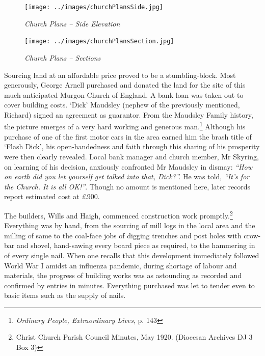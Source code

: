 \begin{figure}[!htb]
\begin{center}
\texttt{[image: ../images/churchPlansSide.jpg]}
\caption{\itshape Church Plans -- Side Elevation}
\end{center}
\end{figure}










\begin{figure}[!htb]
\begin{center}
\texttt{[image: ../images/churchPlansSection.jpg]}
\caption{\itshape Church Plans -- Sections}
\end{center}
\end{figure}




Sourcing land at an affordable price proved to be a stumbling-block. Most generously, George Arnell purchased and donated the land for the site of this much anticipated Murgon Church of England. A bank loan was taken out to cover building costs. `Dick' Maudsley (nephew of the previously mentioned, Richard) signed an agreement as guarantor. From the Maudsley Family history, the picture emerges of a very hard working and generous man.\footnote{\emph{Ordinary People, Extraordinary Lives}, p. 143} Although his purchase of one of the first motor cars in the area earned him the brash title of `Flash Dick', his open-handedness and faith through this sharing of his prosperity were then clearly revealed. Local bank manager and church member, Mr Skyring, on learning of his decision, anxiously confronted Mr Maudsley in dismay: \emph{``How on earth did you let yourself get talked into that, Dick?''.} He was told, \emph{``It's for the Church. It is all OK!''}. Though no amount is mentioned here, later records report estimated cost at \pounds900.


The builders, Wills and Haigh, commenced construction work promptly.\footnote{Christ Church Parish Council Minutes, May 1920. (Diocesan Archives DJ 3 Box 3)} Everything was by hand, from the sourcing of mill logs in the local area and the milling of same to the coal-face jobs of digging trenches and post holes with crow-bar and shovel, hand-sawing every board piece as required, to the hammering in of every single nail. When one recalls that this development immediately followed World War I amidst an influenza pandemic, during shortage of labour and materials, the progress of building works was as astounding as recorded and confirmed by entries in minutes. Everything purchased was let to tender even to basic items such as the supply of nails.


